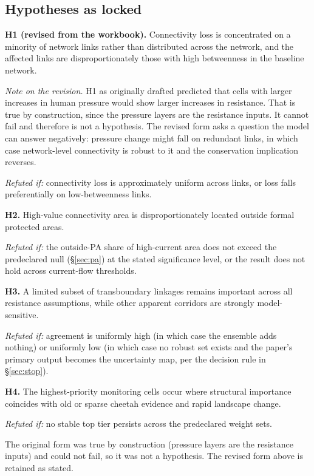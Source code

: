 \subsection{Hypotheses as locked}

\textbf{H1 (revised from the workbook).} Connectivity loss is concentrated on a
minority of network links rather than distributed across the network, and the
affected links are disproportionately those with high betweenness in the
baseline network.

\emph{Note on the revision.} H1 as originally drafted predicted that cells with
larger increases in human pressure would show larger increases in resistance.
That is true by construction, since the pressure layers are the resistance
inputs. It cannot fail and therefore is not a hypothesis. The revised form asks
a question the model can answer negatively: pressure change might fall on
redundant links, in which case network-level connectivity is robust to it and
the conservation implication reverses.

\emph{Refuted if:} connectivity loss is approximately uniform across links, or
loss falls preferentially on low-betweenness links.

\textbf{H2.} High-value connectivity area is disproportionately located outside
formal protected areas.

\emph{Refuted if:} the outside-PA share of high-current area does not exceed the
predeclared null (\S\ref{sec:pa}) at the stated significance level, or the
result does not hold across current-flow thresholds.

\textbf{H3.} A limited subset of transboundary linkages remains important across
all resistance assumptions, while other apparent corridors are strongly
model-sensitive.

\emph{Refuted if:} agreement is uniformly high (in which case the ensemble adds
nothing) or uniformly low (in which case no robust set exists and the paper's
primary output becomes the uncertainty map, per the decision rule in
\S\ref{sec:stop}).

\textbf{H4.} The highest-priority monitoring cells occur where structural
importance coincides with old or sparse cheetah evidence and rapid landscape
change.

\emph{Refuted if:} no stable top tier persists across the predeclared weight
sets.

 The original form was true by construction
(pressure layers are the resistance inputs) and could not fail, so it was not a
hypothesis. The revised form above is retained as stated.

